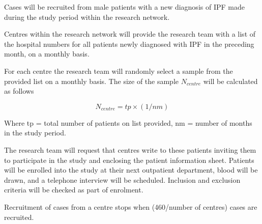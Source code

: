 \documentclass[a4paper,10pt]{article}
\begin{document}
Cases will be recruited from male patients with a new diagnosis of IPF made during the study period within the research network.

Centres within the research network will provide the research team with a list of the hospital numbers for all patients newly diagnosed with IPF in the preceding month, on a monthly basis. 

 For each centre the research team will randomly select a sample from the provided list on a monthly basis. The size of the sample \(N_{centre}\) will be calculated as follows 

 \[N_{centre} = tp \times (1/nm)\]

 Where tp = total number of patients on list provided, nm = number of months in the study period. 

 The research team will request that centres write to these patients inviting them to participate in the study and enclosing the patient information sheet. Patients will be enrolled into the study at their next outpatient department, blood will be drawn, and a telephone interview will be scheduled. Inclusion and exclusion criteria will be checked as part of enrolment.

 Recruitment of cases from a centre stops when (460/number of centres) cases are recruited.
\end{document}
